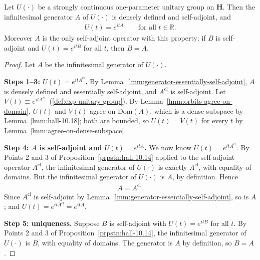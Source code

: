 \begin{theorem}
    \label{thrm:hall-10.15}
    \leanok
    Let $U(\cdot)$ be a strongly continuous one-parameter unitary group on $\mathbf{H}$. Then the infinitesimal generator $A$ of $U(\cdot)$ is densely defined and self-adjoint, and
    \begin{align}
        U(t) = e^{itA} \qquad \text{for all } t \in \mathbb{R}.
    \end{align}
    Moreover $A$ is the only self-adjoint operator with this property: if $B$ is self-adjoint and $U(t) = e^{itB}$ for all $t$, then $B = A$.
\end{theorem}
\begin{proof}
    \leanok
Let $A$ be the infinitesimal generator of $U(\cdot)$.

\textbf{Steps 1–3: $U(t) = e^{itA^{\text{cl}}}$.} By Lemma~\ref{lmm:generator-essentially-self-adjoint}, $A$ is densely defined and essentially self-adjoint, and $A^{\text{cl}}$ is self-adjoint. Let $V(t) \equiv e^{itA^{\text{cl}}}$~(\ref{def:exp-unitary-group}). By Lemma~\ref{lmm:orbits-agree-on-domain}, $U(t)$ and $V(t)$ agree on $\text{Dom}(A)$, which is a dense subspace by Lemma~\ref{lmm:hall-10.18}; both are bounded, so $U(t) = V(t)$ for every $t$ by Lemma~\ref{lmm:agree-on-dense-subspace}.

\textbf{Step 4: $A$ is self-adjoint and $U(t) = e^{itA}$.} We now know $U(t) = e^{itA^{\text{cl}}}$. By Points 2 and 3 of Proposition~\ref{prpstn:hall-10.14} applied to the self-adjoint operator $A^{\text{cl}}$, the infinitesimal generator of $U(\cdot)$ is exactly $A^{\text{cl}}$, with equality of domains. But the infinitesimal generator of $U(\cdot)$ is $A$, by definition. Hence
\begin{align}
    A = A^{\text{cl}}.
\end{align}
Since $A^{\text{cl}}$ is self-adjoint by Lemma~\ref{lmm:generator-essentially-self-adjoint}, so is $A$; and $U(t) = e^{itA^{\text{cl}}} = e^{itA}$.

\textbf{Step 5: uniqueness.} Suppose $B$ is self-adjoint with $U(t) = e^{itB}$ for all $t$. By Points 2 and 3 of Proposition~\ref{prpstn:hall-10.14}, the infinitesimal generator of $U(\cdot)$ is $B$, with equality of domains. The generator is $A$ by definition, so $B = A$.
\end{proof}

